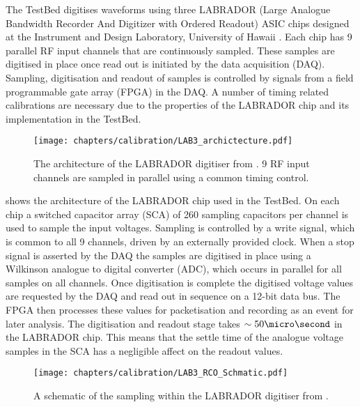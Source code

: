 The TestBed digitises waveforms using three LABRADOR (Large Analogue Bandwidth Recorder And Digitizer with Ordered Readout) ASIC chips designed at the Instrument and Design Laboratory, University of Hawaii \cite{Varner2007447}. Each chip has 9 parallel RF input channels that are continuously sampled. These samples are digitised in place once read out is initiated by the data acquisition (DAQ). Sampling, digitisation and readout of samples is controlled by signals from a field programmable gate array (FPGA) in the DAQ. A number of timing related calibrations are necessary due to the properties of the LABRADOR chip and its implementation in the TestBed. 

\begin{figure}[htpb]
  \texttt{[image: chapters/calibration/LAB3\_archictecture.pdf]}
  \caption{The architecture of the LABRADOR digitiser from \cite{Varner2007447}. 9 RF input channels are sampled in parallel using a common timing control.}
  \label{fig:calibration:LABRADOR-Digitiser-Chip:Architecture}
\end{figure}

 shows the architecture of the LABRADOR chip used in the TestBed. On each chip a switched capacitor array (SCA) of 260 sampling capacitors per channel is used to sample the input voltages. Sampling is controlled by a write signal, which is common to all 9 channels, driven by an externally provided clock. When a stop signal is asserted by the DAQ the samples are digitised in place using a Wilkinson analogue to digital converter (ADC), which occurs in parallel for all samples on all channels. Once digitisation is complete the digitised voltage values are requested by the DAQ and read out in sequence on a 12-bit data bus. The FPGA then processes these values for packetisation and recording as an event for later analysis. The digitisation and readout stage takes $\sim 50 \micro \second$ in the LABRADOR chip. This means that the settle time of the analogue voltage samples in the SCA has a negligible affect on the readout values.



\begin{figure}[htpb]
  \texttt{[image: chapters/calibration/LAB3\_RCO\_Schmatic.pdf]}
  \caption{A schematic of the sampling within the LABRADOR digitiser from \cite{Varner2007447}.}
  \label{fig:calibration:LABRADOR-Digitiser-Chip:Schematic}
\end{figure}



